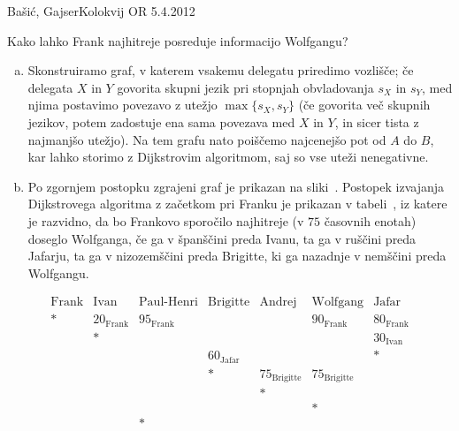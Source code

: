 \begin{naloga}{Bašić, Gajser}{Kolokvij OR 5.4.2012}
\begin{vprasanje}
\begin{enumerate}[(a)]
\bigskip
Kako lahko Frank najhitreje posreduje informacijo Wolfgangu?
\end{enumerate}
\end{vprasanje}

\begin{odgovor}
\begin{enumerate}[(a)]
\item Skonstruiramo graf, v katerem vsakemu delegatu priredimo vozlišče;
če delegata $X$ in $Y$ govorita skupni jezik
pri stopnjah obvladovanja $s_X$ in $s_Y$,
med njima postavimo povezavo z utežjo $\max\{s_X, s_Y\}$
(če govorita več skupnih jezikov,
potem zadostuje ena sama povezava med $X$ in $Y$,
in sicer tista z najmanjšo utežjo).
Na tem grafu nato poiščemo najcenejšo pot od $A$ do $B$,
kar lahko storimo z Dijkstrovim algoritmom,
saj so vse uteži nenegativne.

\item Po zgornjem postopku zgrajeni graf je prikazan na sliki~\fig.
Postopek izvajanja Dijkstrovega algoritma z začetkom pri Franku
je prikazan v tabeli~\tab,
iz katere je razvidno, da bo Frankovo sporočilo najhitreje
(v $75$ časovnih enotah) do\-seg\-lo Wolfganga,
če ga v španščini preda Ivanu,
ta ga v ruščini preda Jafarju,
ta ga v nizozemščini preda Brigitte,
ki ga nazadnje v nemščini preda Wolfgangu.
\end{enumerate}
%
\begin{slika}
\pgfslika
{}
\end{slika}
%
\begin{tabela}
$$
\begin{array}{ccccccc}
\text{Frank} & \text{Ivan} & \text{Paul-Henri} & \text{Brigitte} & \text{Andrej} & \text{Wolfgang} & \text{Jafar} \\ \hline
* & 20_{\text{Frank}} & 95_{\text{Frank}} &&& 90_{\text{Frank}} & 80_{\text{Frank}} \\
& * &&&&& 30_{\text{Ivan}} \\
&&& 60_{\text{Jafar}} &&& * \\
&&& * & 75_{\text{Brigitte}} & 75_{\text{Brigitte}} & \\
&&&& * && \\
&&&&& * & \\
&& * &&&& \\
\end{array}
$$
\end{tabela}
\end{odgovor}
\end{naloga}
